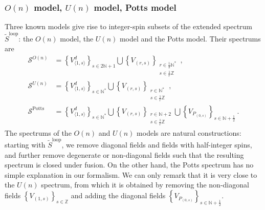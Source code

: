 \documentclass[12pt, a4paper]{article}
\theoremstyle{break}
\begin{document}
\subsubsection{$O(n)$ model, $U(n)$ model, Potts model}\label{sec:models}

Three known models give rise to integer-spin subsets of the extended spectrum $\widetilde{S}^\text{loop}$: the $O(n)$ model, the $U(n)$ model and the Potts model. 
Their spectrums are 
\begin{align}
\mathcal{S}^{O(n)} &= \left\{V^d_{\langle 1,s\rangle}\right\}_{s\in 2\mathbb{N}+1} \bigcup \left\{V_{(r,s)}\right\}_{\substack{r\in \frac12\mathbb{N}^*\\ s\in\frac{1}{r}\mathbb{Z}}}  \ ,
 \\
 \mathcal{S}^{U(n)} &= \left\{V^d_{\langle 1,s\rangle}\right\}_{s\in\mathbb{N}^*} \bigcup \left\{V_{(r,s)}\right\}_{\substack{r\in \mathbb{N}^*\\ s\in\frac{1}{r}\mathbb{Z}}}  \ ,
 \\
 \mathcal{S}^\text{Potts} &= \left\{V^d_{\langle 1,s\rangle}\right\}_{s\in\mathbb{N}^*} \bigcup \left\{V_{(r,s)}\right\}_{\substack{r\in \mathbb{N}+2\\ s\in\frac{1}{r}\mathbb{Z}}} \bigcup  \left\{ V_{P_{(0,s)}}\right\}_{s\in \mathbb{N}+\frac12}\ .
\end{align}
The spectrums of the $O(n)$ and $U(n)$ models are natural constructions: starting with $\widetilde{S}^\text{loop}$, we remove diagonal fields and fields with half-integer spins, and further remove degenerate or non-diagonal fields such that the resulting spectrum is closed under fusion. On the other hand, the Potts spectrum has no simple explanation in our formalism. We can only remark that it is very close to the $U(n)$ spectrum, from which it is obtained by removing the non-diagonal fields $\left\{V_{(1,s)}\right\}_{s\in\mathbb{Z}}$ and adding the diagonal fields $\left\{ V_{P_{(0,s)}}\right\}_{s\in \mathbb{N}+\frac12}$. 
\end{document}
